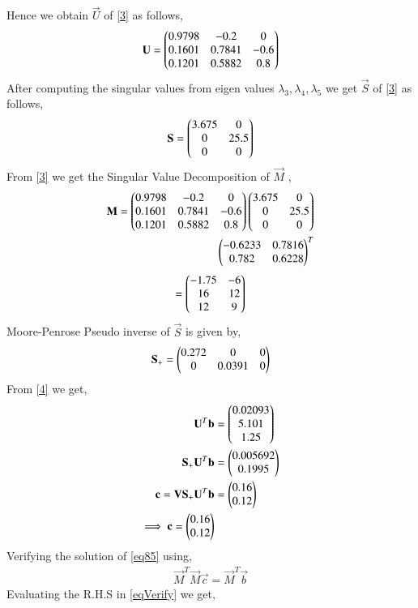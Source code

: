 \documentclass[journal,12pt,twocolumn]{IEEEtran}
\begin{document}
Hence we obtain $\vec{U}$ of \eqref{3} as follows,
\begin{align}
\mathbf{U}=\begin{pmatrix}0.9798&-0.2&0\\0.1601&0.7841&-0.6\\0.1201&0.5882&0.8\end{pmatrix}
\end{align}
After computing the singular values from eigen values $\lambda_3, \lambda_4, \lambda_5$ we get $\vec{S}$ of \eqref{3} as follows,
\begin{align}\label{eqS}
\mathbf{S}=\begin{pmatrix}3.675&0\\0&25.5\\0&0\end{pmatrix}
\end{align}
From \eqref{3} we get the Singular Value Decomposition of $\vec{M}$ ,
\begin{align}
\mathbf{M} = \begin{pmatrix}0.9798&-0.2&0\\0.1601&0.7841&-0.6\\0.1201&0.5882&0.8\end{pmatrix}\begin{pmatrix}3.675&0\\0&25.5\\0&0\end{pmatrix}\\\begin{pmatrix}-0.6233&0.7816\\0.782&0.6228\end{pmatrix}^T
\end{align}
\begin{align}
=\begin{pmatrix}-1.75 & -6 \\ 16 & 12 \\ 12 & 9\end{pmatrix}    
\end{align}
Moore-Penrose Pseudo inverse of $\vec{S}$ is given by,
\begin{align}
\mathbf{S_+} = \begin{pmatrix}0.272&0&0\\0&0.0391&0\end{pmatrix}
\end{align}
From \eqref{4} we get,
\begin{align}
\mathbf{U}^T\mathbf{b}&=\begin{pmatrix}0.02093\\5.101\\1.25\end{pmatrix}\\
\mathbf{S_+}\mathbf{U}^T\mathbf{b}&=\begin{pmatrix}0.005692\\0.1995\end{pmatrix}\\
\mathbf{c} = \mathbf{V}\mathbf{S_+}\mathbf{U}^T\mathbf{b} &= \begin{pmatrix}0.16\\0.12\end{pmatrix}\\
\implies\mathbf{c}=\begin{pmatrix}0.16\\0.12\end{pmatrix}\label{eq85}
\end{align}
Verifying the solution of \eqref{eq85} using,
\begin{align}
\vec{M}^T\vec{M}\vec{c} = \vec{M}^T\vec{b}\label{eqVerify}
\end{align}
Evaluating the R.H.S in \eqref{eqVerify} we get,
\end{document}

